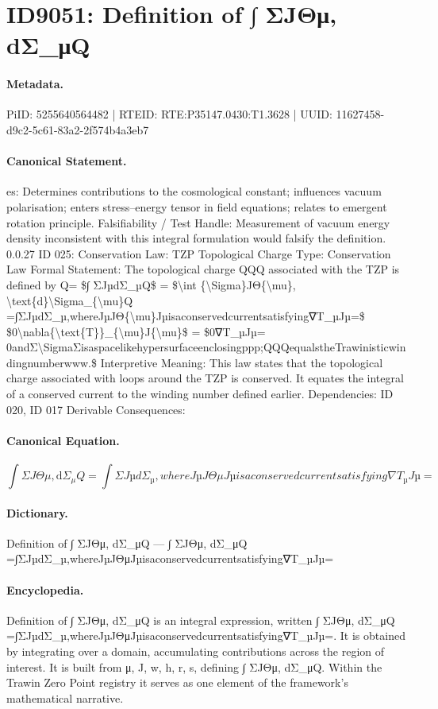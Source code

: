\section*{ID9051: Definition of ∫ ΣJΘμ, dΣ\_μQ}
\paragraph{Metadata.}
PiID: 5255640564482 | RTEID: RTE:P35147.0430:T1.3628 | UUID: 11627458-d9c2-5c61-83a2-2f574b4a3eb7

\paragraph{Canonical Statement.}
es: Determines contributions to the cosmological constant; influences vacuum polarisation; enters stress–energy tensor in field equations; relates to emergent rotation principle. Falsifiability / Test Handle: Measurement of vacuum energy density inconsistent with this integral formulation would falsify the definition. 0.0.27 ID 025: Conservation Law: TZP Topological Charge Type: Conservation Law Formal Statement: The topological charge QQQ associated with the TZP is defined by Q= \$∫ ΣJµdΣ\_µQ\$ = \$\textbackslash{}int \{\textbackslash{}Sigma\}JΘ\{\textbackslash{}mu\}, \textbackslash{}text\{d\}\textbackslash{}Sigma\_\{\textbackslash{}mu\}Q =∫ΣJµdΣ\_µ,whereJµJΘ\{\textbackslash{}mu\}Jµisaconservedcurrentsatisfying∇T\_µJµ=\$ \$0\textbackslash{}nabla\{\textbackslash{}text\{T\}\}\_\{\textbackslash{}mu\}J\{\textbackslash{}mu\}\$ = \$0∇T\_µJµ= 0andΣ\textbackslash{}SigmaΣisaspacelikehypersurfaceenclosingppp;QQQequalstheTrawinisticwindingnumberwww.\$ Interpretive Meaning: This law states that the topological charge associated with loops around the TZP is conserved. It equates the integral of a conserved current to the winding number defined earlier. Dependencies: ID 020, ID 017 Derivable Consequences:

\paragraph{Canonical Equation.}
\[
\int {\Sigma}JΘ{\mu}, \text{d}\Sigma_{\mu}Q =∫ΣJµdΣ_µ,whereJµJΘ{\mu}Jµisaconservedcurrentsatisfying∇T_µJµ=
\]

\paragraph{Dictionary.}
Definition of ∫ ΣJΘμ, dΣ\_μQ — ∫ ΣJΘμ, dΣ\_μQ =∫ΣJµdΣ\_µ,whereJµJΘμJµisaconservedcurrentsatisfying∇T\_µJµ=

\paragraph{Encyclopedia.}
Definition of ∫ ΣJΘμ, dΣ\_μQ is an integral expression, written ∫ ΣJΘμ, dΣ\_μQ =∫ΣJµdΣ\_µ,whereJµJΘμJµisaconservedcurrentsatisfying∇T\_µJµ=. It is obtained by integrating over a domain, accumulating contributions across the region of interest. It is built from μ, J, w, h, r, s, defining ∫ ΣJΘμ, dΣ\_μQ. Within the Trawin Zero Point registry it serves as one element of the framework's mathematical narrative.
